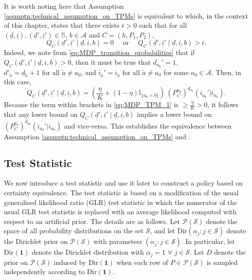It is worth noting here that Assumption \ref{assmptn:technical_assumption_on_TPMs} is equivalent to \cite[Assumption I]{borkar1979adaptive} which, in the context of this chapter, states that there exists $\bar{\epsilon}>0$ such that for all $(\underline{d}, \underline{i}), (\underline{d}', \underline{i}') \in \mathbb{S}$, $b\in \mathcal{A}$ and $C=(h, P_1, P_2)$, 
		$$
		Q_{C}(\underline{d}', \underline{i}'\mid \underline{d}, \underline{i}, b)=0 \quad \text{ or }\quad  Q_{C}(\underline{d}', \underline{i}'\mid \underline{d}, \underline{i}, b)>\bar{\epsilon}.
		$$
		{\color{black} Indeed, we note from \eqref{eq:MDP_transition_probabilities} that if $Q_C(\underline{d}', \underline{i}' \mid \underline{d}, \underline{i}, b)>0$, then it must be true that $d_{a_{0}}'=1$, $d'_{\tilde{a}}=d_{\tilde{a}}+1\text{ for all }\tilde{a}\neq a_{0}$, and $i_{\tilde{a}}'=i_{\tilde{a}}\text{ for all }\tilde{a}\neq a_{0}$ for some $a_{0}\in \mathcal{A}$. Then, in this case,	
		\begin{equation}
			Q_{C}(\underline{d}', \underline{i}'\mid \underline{d}, \underline{i}, b)=\left(\frac{\eta}{K}+(1-\eta)\mathbb{I}_{\{a_{0}=b\}}\right)~(P_C^{a_{0}})^{d_{a_{0}}}(i_{a_{0}}'|i_{a_{0}}).
			\label{eq:MDP_TPM_1}
		\end{equation}
		Because the term within brackets in \eqref{eq:MDP_TPM_1} is $\geq \frac{\eta}{K}>0$, it follows that any lower bound on $Q_{C}(\underline{d}', \underline{i}'\mid \underline{d}, \underline{i}, b)$ implies a lower bound on $(P_C^{a_{0}})^{d_{a_{0}}}(i_{a_{0}}'|i_{a_{0}})$ and vice-versa.} This establishes the equivalence between Assumption \ref{assmptn:technical_assumption_on_TPMs} and \cite[Assumption I]{borkar1979adaptive}. 

\subsection{Test Statistic}
We now introduce a test statistic and use it later to construct a policy based on certainty equivalence. The test statistic is based on a modification of the usual generalised likelihood ratio (GLR) test statistic in which the numerator of the usual GLR test statistic is replaced with an average likelihood computed with respect to an artificial prior. The details are as follows. Let $\mathcal{P}(\mathcal{S})$ denote the space of all probability distributions on the set $\mathcal{S}$, and let $\text{Dir}(\alpha_j:j\in \mathcal{S})$ denote the Dirichlet prior on $\mathcal{P}(\mathcal{S})$ with parameters $(\alpha_j:j\in \mathcal{S})$.  In particular, let $\text{Dir}(\mathbf{1})$ denote the Dirichlet distribution with $\alpha_j=1$ $\forall$ $j\in \mathcal{S}$. Let $D$ denote the prior on $\mathscr{P}(\mathcal{S})$ induced by $\text{Dir}(\mathbf{1})$ when each row of $P\in \mathscr{P}(\mathcal{S})$ is sampled independently according to $\text{Dir}(\mathbf{1})$. 


